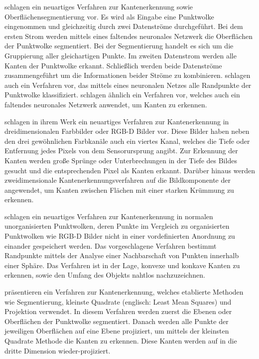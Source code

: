 \Textcite{hu_jsenet_2020} schlagen ein neuartiges Verfahren zur Kantenerkennung sowie Oberflächensegmentierung vor. Es wird als Eingabe eine Punktwolke eingenommen und gleichzeitig durch zwei Datenströme durchgeführt. Bei dem ersten Strom werden mittels eines faltendes neuronales Netzwerk die Oberflächen der Punktwolke segmentiert. Bei der Segmentierung handelt es sich um die Gruppierung aller gleichartigen Punkte. Im zweiten Datenstrom werden alle Kanten der Punktwolke erkannt. Schließlich werden beide Datenströme zusammengeführt um die Informationen beider Ströme zu kombinieren. \Textcite{bazazian_edc-net_2021} schlagen auch ein Verfahren vor, das mittels eines neuronalen Netzes alle Randpunkte der Punktwolke klassifiziert. \Textcite{himeur_pcednet_2021} schlagen ähnlich ein Verfahren vor, welches auch ein faltendes neuronales Netzwerk anwendet, um Kanten zu erkennen. 

\Textcite{choi_rgb-d_2013} schlagen in ihrem Werk ein neuartiges Verfahren zur Kantenerkennung in dreidimensionalen Farbbilder oder RGB-D Bilder vor. Diese Bilder haben neben den drei gewöhnlichen Farbkanäle auch ein viertes Kanal, welches die Tiefe oder Entfernung jedes Pixels von dem Sensorursprung angibt. Zur Erkennung der Kanten werden große Sprünge oder Unterbrechungen in der Tiefe des Bildes gesucht und die entsprechenden Pixel als Kanten erkannt. Darüber hinaus werden zweidimensionale Kantenerkennungsverfahren auf die Bildkomponente der angewendet, um Kanten zwischen Flächen mit einer starken Krümmung zu erkennen. 

\Textcite{mineo_novel_2019} schlagen ein neuartiges Verfahren zur Kantenerkennung in normalen unorganisierten Punktwolken, deren Punkte im Vergleich zu organisierten Punktwolken wie RGB-D Bilder nicht in einer vordefinierten Anordnung zu einander gespeichert werden. Das vorgeschlagene Verfahren bestimmt Randpunkte mittels der Analyse einer Nachbarschaft von Punkten innerhalb einer Sphäre. Das Verfahren ist in der Lage, konvexe und konkave Kanten zu erkennen, sowie den Umfang des Objekts nahtlos nachzuzeichnen.

\Textcite{lu_fast_2019} präsentieren ein Verfahren zur Kantenerkennung, welches etablierte Methoden wie Segmentierung, kleinste Quadrate (englisch: Least Mean Squares) und Projektion verwendet. In diesem Verfahren werden zuerst die Ebenen oder Oberflächen der Punktwolke segmentiert. Danach werden alle Punkte der jeweiligen Oberflächen auf eine Ebene projiziert, um mittels der kleinsten Quadrate Methode die Kanten zu erkennen. Diese Kanten werden auf in die dritte Dimension wieder-projiziert.

